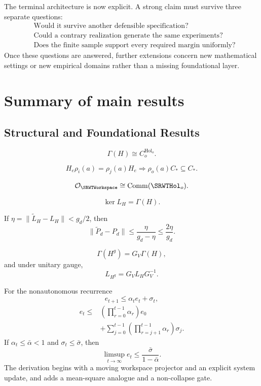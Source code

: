 The terminal architecture is now explicit. A strong claim must survive three
separate questions:
\[
\boxed{
\begin{aligned}
&\text{Would it survive another defensible specification?}\\
&\text{Could a contrary realization generate the same experiments?}\\
&\text{Does the finite sample support every required margin uniformly?}
\end{aligned}
}
\]
Once these questions are answered, further extensions concern new mathematical
settings or new empirical domains rather than a missing foundational layer.


\chapter{Summary of main results}\label{SRWT:book:chapter-85}


\section{Structural and Foundational Results}

\[
\Gamma(H)\cong C_o^{\operatorname{Hol}_o}.
\]

\[
H_e\rho_i(a)=\rho_j(a)H_e
\Longrightarrow
\rho_o(a)C_*\subseteq C_*.
\]

\[
\mathcal O_{\SRWTWorkspace}
\cong
\operatorname{Comm}(\SRWTHol_o).
\]

\[
\ker L_H=\Gamma(H).
\]

If \(\eta=\|\widetilde L_H-L_H\|<g_d/2\), then
\[
\|\widetilde P_d-P_d\|
\leq
\frac{\eta}{g_d-\eta}
\leq
\frac{2\eta}{g_d}.
\]

\[
\Gamma(H^g)=G_V\Gamma(H),
\]
and under unitary gauge,
\[
L_{H^g}=G_VL_HG_V^{-1}.
\]


For the nonautonomous recurrence
\[
e_{t+1}\leq\alpha_te_t+\sigma_t,
\]
\[
\boxed{
\begin{aligned}
e_t
\leq
&\left(\prod_{r=0}^{t-1}\alpha_r\right)e_0\\
&+\sum_{j=0}^{t-1}
\left(\prod_{r=j+1}^{t-1}\alpha_r\right)\sigma_j.
\end{aligned}
}
\]
If \(\alpha_t\leq\bar\alpha<1\) and \(\sigma_t\leq\bar\sigma\), then
\[
\limsup_{t\to\infty}e_t
\leq
\frac{\bar\sigma}{1-\bar\alpha}.
\]
The derivation begins with a moving workspace projector and
an explicit system update, and adds a mean-square analogue and a non-collapse
gate.

